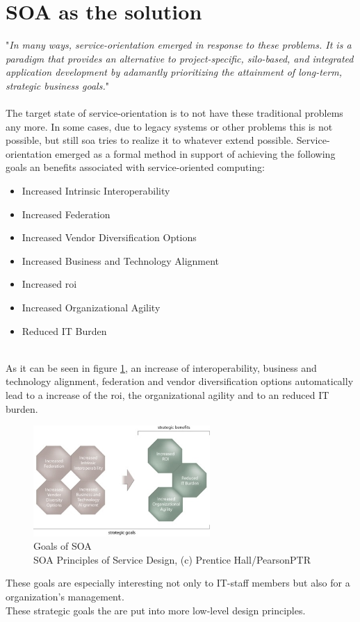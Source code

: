\documentclass[12pt]{article}
\begin{document}
\section{SOA as the solution} 
"\textit{In many ways, service-orientation emerged in response to these problems. It is a paradigm that provides an alternative to project-specific, silo-based, and integrated application development by adamantly prioritizing the attainment of long-term, strategic business goals.}"\cite[page 522]{grau} \\ \\
The target state of service-orientation is to not have these traditional problems any more. In some cases, due to legacy systems or other problems this is not possible, but still \gls{soa} tries to realize it to whatever extend possible.
\newpage\noindent
Service-orientation emerged as a formal method in support of achieving the following goals an benefits associated with service-oriented computing: \\
\begin{itemize}
\item Increased Intrinsic Interoperability
\item Increased Federation
\item Increased Vendor Diversification Options 
\item Increased Business and Technology Alignment
\item Increased \gls{roi}
\item Increased Organizational Agility
\item Reduced IT Burden
\end{itemize} \cite[page 23]{grau}\\
As it can be seen in figure \ref{fig:goalssoa}, an increase of interoperability,  business and technology alignment, federation and vendor diversification options automatically lead to a increase of the \gls{roi}, the organizational agility and to an reduced IT burden.
\begin{figure}[here!]
	\centering
	\includegraphics[width=0.6\textwidth]{images/page24}
	\caption{Goals of SOA\cite{photos}\\ SOA Principles of Service Design, (c) Prentice Hall/PearsonPTR}
	\label{fig:goalssoa}
	\end{figure}
\FloatBarrier
 \noindent
These goals are especially interesting not only to IT-staff members but also for a organization's management. \\
These strategic goals the are put into more low-level design principles.
\newpage\noindent
\end{document}
